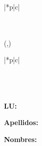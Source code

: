 {{{\begin{textblock}{\anchodegrilla}
\begin{tabular}{|*{\value{total}}{p{\anchodecasilla}|}c|}
          \hline
          \primerafila\\
          \hline
          \tercerafila\\
          \tercerafila\\
          \hline
        \end{tabular}
      \end{textblock}
    }
    {%
      \begin{textblock}{\anchodegrilla}(\izquierda,\abajo)
        \begin{tabular}{|*{\value{total}}{p{\anchodecasilla}|}c|}
          \hline
          \primerafila\\
          \rayitas
          \segundafila\\
          \hline
          \tercerafila\\
          \tercerafila\\
          \hline
        \end{tabular}
      \end{textblock}
    }
  }%
  \vspace{0.4cm}
  \textbf{LU:}
  
  \textbf{Apellidos:}
  
  \textbf{Nombres:}
  \vspace{0.5cm}
}




\setcounter{consigna}{0}

\newenvironment{consignas}{%
  \newcommand{\consigna}{\stepcounter{consigna}\textbf{\theconsigna.}}%
  \renewcommand{\ejercicio}[1]{\item ##1 }
  \renewcommand{\problema}[5][result]{\item
    \encabezadoDeProblema{##1}{##2}{##3}{##4}\hspace{1em}##5}%
  \newcommand{\invariante}[2]{\item%
    {\normalfont\bfseries\ttfamily invariante}%
    \ ##1\hspace{1em}##2%
  }
  \renewcommand{\aux}[4]{\item%
    {\normalfont\bfseries\ttfamily aux\ }%
    {\normalfont\ttfamily ##1}%
    \ifthenelse{\equal{##2}{}}{}{\ (##2)}\ : ##3 \hspace{1em}##4%
  }
  \begin{list}{\consigna}{%
      \setlength{\itemsep}{0.5em}%
      \setlength{\parsep}{0cm}%
    }
}%
{\end{list}}



